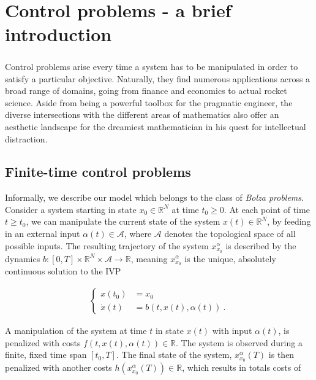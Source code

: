 \chapter{Control problems - a brief introduction} 

	\paragraph{}
	Control problems arise every time a system has to be manipulated in order to satisfy a particular objective. Naturally, they find numerous applications across a broad range of domains, going from finance and economics to actual rocket science. Aside from being a powerful toolbox for the pragmatic engineer, the diverse intersections with the different areas of mathematics also offer an aesthetic landscape for the dreamiest mathematician in his quest for intellectual distraction. 
	
	\section{Finite-time control problems}
	
	Informally, we describe our model which belongs to the class of \emph{Bolza problems}. Consider a system starting in state $ x_0 \in \mathbb{R}^N $ at time $ t_0 \geq 0 $. At each point of time $ t \geq t_0 $, we can manipulate the current state of the system $ x(t) \in \mathbb{R}^N $, by feeding in an external input $ \alpha(t) \in \mathcal{A} $, where $ \mathcal{A} $ denotes the topological space of all possible inputs. The resulting trajectory of the system $ x^{\alpha}_{x_0} $ is described by the dynamics $ b : \left[ 0 , T \right] \times \mathbb{R}^N \times \mathcal{A} \to \mathbb{R} $, meaning $ x^{\alpha}_{x_0} $ is the unique, absolutely continuous solution to the IVP
	
	\begin{align*}
	\begin{cases}
	x(t_0) &= x_0 \\
	\dot{x}(t) &= b(t, x(t), \alpha(t)) \ .
	\end{cases}
	\end{align*}
	
	A manipulation of the system at time $ t $ in state $ x(t) $ with input $ \alpha(t) $, is penalized with costs $ f(t, x(t), \alpha(t)) \in \mathbb{R} $. The system is observed during a finite, fixed time span $ \left[t_0, T \right] $. The final state of the system, $ x^{\alpha}_{x_0}(T) $ is then penalized with another costs $ h(x^{\alpha}_{x_0}(T)) \in \mathbb{R} $, which results in totals costs of
	
